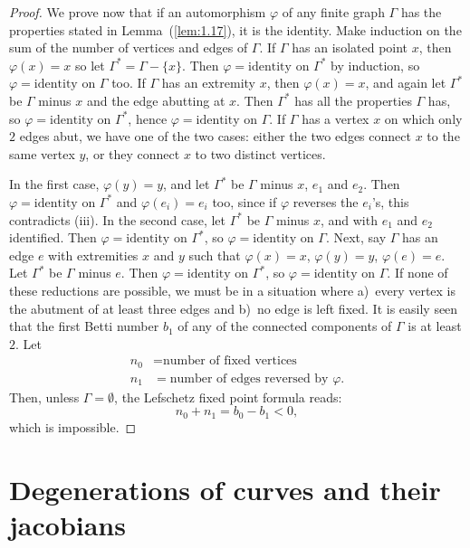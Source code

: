 \documentclass[10pt]{amsart}
\theoremstyle{plain}
\theoremstyle{definition}
\begin{document}
\begin{proof}
We prove now that if an automorphism $\varphi$ of any finite graph $\Gamma$ has the properties stated in Lemma~(\ref{lem:1.17}), it is the identity. Make induction on the sum of the number of vertices and edges of $\Gamma$. If $\Gamma$ has an isolated point $x$, then $\varphi(x) = x$ so let $\Gamma^* = \Gamma - \{x\}$. Then $\varphi = \mathrm{identity}$ on $\Gamma^*$ by induction, so $\varphi = \mathrm{identity}$ on $\Gamma$ too. If $\Gamma$ has an extremity $x$, then $\varphi(x) = x$, and again let $\Gamma^*$ be $\Gamma$ minus $x$ and the edge abutting at $x$. Then $\Gamma^*$ has all the properties $\Gamma$ has, so $\varphi = \mathrm{identity}$ on $\Gamma^*$, hence $\varphi = \mathrm{identity}$ on $\Gamma$. If $\Gamma$ has a vertex $x$ on which only $2$ edges abut, we have one of the two cases: either the two edges connect $x$ to the same vertex $y$, or they connect $x$ to two distinct vertices.

In the first case, $\varphi(y) = y$, and let $\Gamma^*$ be $\Gamma$ minus $x$, $e_1$ and $e_2$. Then $\varphi = \mathrm{identity}$ on $\Gamma^*$ and $\varphi(e_i) = e_i$ too, since if $\varphi$ reverses the $e_i$'s, this contradicts (iii). In the second case, let $\Gamma^*$ be $\Gamma$ minus $x$, and with $e_1$ and $e_2$ identified. Then $\varphi = \mathrm{identity}$ on $\Gamma^*$, so $\varphi = \mathrm{identity}$ on $\Gamma$. Next, say $\Gamma$ has an edge $e$ with extremities $x$ and $y$ such that $\varphi(x) = x$, $\varphi(y) = y$, $\varphi(e) = e$. Let $\Gamma^*$ be $\Gamma$ minus $e$. Then $\varphi = \mathrm{identity}$ on $\Gamma^*$, so $\varphi = \mathrm{identity}$ on $\Gamma$. If none of these reductions are possible, we must be in a situation where a)~every vertex is the abutment of at least three edges and b)~no edge is left fixed. It is easily seen that the first Betti number $b_1$ of any of the connected components of $\Gamma$ is at least $2$. Let
\begin{align*}
n_0 &= \text{number of fixed vertices} \\
n_1 &= \text{number of edges reversed by } \varphi.
\end{align*}
Then, unless $\Gamma = \emptyset$, the Lefschetz fixed point formula reads:
\[
n_0 + n_1 = b_0 - b_1 < 0,
\]
which is impossible.
\end{proof}

\section{Degenerations of curves and their jacobians}\label{sec:2}
\end{document}
